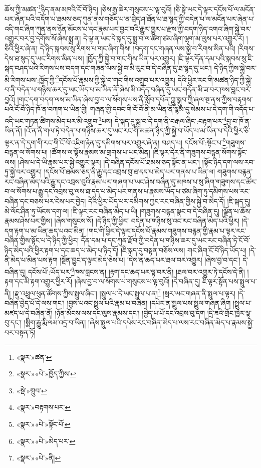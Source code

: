 ཆོས་ཀྱི་མཚན་\footnote{«སྣར་»ཚན་}ཉིད་ནམ་མཁའི་ངོ་བོ་ཉིད། །ཅེས་རྒྱ་ཆེར་གསུངས་པ་ལྟ་བུའོ། །ཅི་སྟེ་ཡང་དེ་ལྟར་དངོས་པོ་ལ་མངོན་པར་ཞེན་པའི་བདོག་པ་ཐམས་ཅད་ཀུན་ནས་གཅོད་པ་ན་བྲེད་ཤ་ཐོན་པ་ཐ་སྙད་ཀྱི་བདེན་པ་ལ་མངོན་པར་ཞེན་པ་འདི་གང་ཞིག་ཀུན་ནས་ཉོན་མོངས་པ་དང་རྣམ་པར་བྱང་བའི་རྒྱུར་གྱུར་པ་རྫས་ཀྱི་བདག་ཉིད་འགའ་ཞིག་སྐྱེ་བར་འགྱུར་བར་བྱ་དགོས་སོ་ཞེས་སྨྲ་ན། དེ་ལྟ་ན་ཡང་དེ་སྐད་དུ་སྨྲ་བ་ལ་ཚིག་ཙམ་ཞིག་ལྷག་མ་ལུས་པར་འགྱུར་རོ། །ཅིའི་ཕྱིར་ཞེ་ན། དེ་ཉིད་སྐབས་སུ་རིགས་པ་གང་ཞིག་གིས། །བདག་དང་གཞན་ལས་སྐྱེ་བ་རིགས་མིན་པའི། །རིགས་དེས་ཐ་སྙད་དུ་ཡང་རིགས་མིན་པས། །ཁྱོད་ཀྱི་སྐྱེ་བ་གང་གིས་ཡིན་པར་འགྱུར། །ཇི་ལྟར་དོན་དམ་པའི་སྐབས་སུ་ཇི་སྐད་བཤད་པའི་རིགས་པས་བདག་དང་གཞན་ལས་སྐྱེ་བ་མི་རུང་བ་དེ་བཞིན་དུ་ཐ་སྙད་དུ་ཡང་། དེ་ཉིད་ཀྱིས་སྐྱེ་བར་མི་རིགས་པས་:ཁྱོད་ཀྱི་\footnote{«སྣར་»«པེ་»ཁྱོད་ཀྱིས་}དངོས་པོ་རྣམས་ཀྱི་སྐྱེ་བ་གང་གིས་འགྲུབ་པར་འགྱུར། དེའི་ཕྱིར་རང་གི་མཚན་ཉིད་ཀྱི་སྐྱེ་བ་ནི་བདེན་པ་གཉིས་ཆར་དུ་ཡང་ཡོད་པ་མ་ཡིན་ནོ་ཞེས་མི་འདོད་བཞིན་དུ་ཡང་གདོན་མི་ཟ་བར་ཁས་བླང་བར་བྱའོ། །གང་དག་བདག་ལས་མ་ཡིན་ཞེས་བྱ་བ་ལ་སོགས་པས་ནི་སློབ་དཔོན་ཀླུ་སྒྲུབ་ཀྱི་ཞལ་སྔ་ནས་ཀྱིས་བརྟགས་པའི་ངོ་བོ་ཉིད་ཁོ་ན་བཀག་པ་ཡིན་གྱི། གཞན་གྱི་དབང་གི་ངོ་བོ་ནི་མ་ཡིན་ནོ་སྙམ་དུ་སེམས་པ་དེ་དག་གི་འདོད་པ་འདི་ཡང་གཏན་ཚིགས་མེད་པར་མི་འགྲུབ་\footnote{«སྡེ་»གྲུབ་}པས། དེ་སྐད་དུ་སྨྲ་བ་དེ་དག་ནི་བརྒལ་ཞིང་:བརྟག་པར་\footnote{«སྣར་»བརྟགས་པར་}བྱ་བ་ཁོ་ན་ཡིན་ནོ། །འོ་ན་ནི་གལ་ཏེ་བདེན་པ་གཉིས་ཆར་དུ་ཡང་རང་གི་མཚན་ཉིད་ཀྱི་སྐྱེ་བ་ཡོད་པ་མ་ཡིན་པ་དེའི་ཕྱིར་ཅི་ལྟར་ན་དེ་དག་གི་རང་གི་ངོ་བོ་འཇིག་རྟེན་དུ་དམིགས་པར་འགྱུར་ཞེ་ན། བཤད་པ། དངོས་པོ་:སྟོང་པ་\footnote{«སྣར་»«པེ་»སྟོང་པོ་}གཟུགས་བརྙན་ལ་སོགས་པ། །ཚོགས་ལ་ལྟོས་རྣམས་མ་གྲགས་པ་ཡང་མིན། །ཇི་ལྟར་དེར་ནི་གཟུགས་བརྙན་སོགས་སྟོང་ལས། །ཤེས་པ་དེ་ཡི་རྣམ་པར་སྐྱེ་འགྱུར་ལྟར། །དེ་བཞིན་དངོས་པོ་ཐམས་ཅད་སྟོང་ན་ཡང་། །སྟོང་ཉིད་དག་ལས་རབ་ཏུ་སྐྱེ་བར་འགྱུར། །དངོས་པོ་ཐམས་ཅད་ནི་རྒྱུ་དང་འབྲས་བུ་ཐ་དད་པ་མེད་པར་གནས་པ་ཡིན་ལ། གཟུགས་བརྙན་རང་བཞིན་མེད་པའི་རྒྱུ་དང་འབྲས་བུའི་རྣམ་པར་གཞག་པ་ཡང་ཤེས་བཞིན་དུ་མཁས་པ་སུ་ཞིག་གཟུགས་དང་ཚོར་བ་ལ་སོགས་པ་རྒྱུ་དང་འབྲས་བུ་ལས་ཐ་དད་པ་མེད་པར་གནས་པ་རྣམས་ཡོད་པ་ཙམ་ཞིག་ཏུ་དམིགས་པས་རང་བཞིན་དང་བཅས་པར་ངེས་པར་བྱེད། དེའི་ཕྱིར་ཡོད་པར་དམིགས་ཀྱང་རང་བཞིན་གྱིས་སྐྱེ་བ་མེད་དོ། །ཇི་སྐད་དུ། མེ་ལོང་ཤིན་ཏུ་ཡོངས་དག་ལ། །ཇི་ལྟར་རང་བཞིན་མེད་པ་ཡི། །གཟུགས་བརྙན་སྣང་བ་དེ་བཞིན་དུ། །ལྗོན་པ་ཆོས་རྣམས་ཤེས་པར་གྱིས། །ཞེས་གསུངས་སོ། །དེ་ཉིད་ཀྱི་ཕྱིར། བདེན་པ་གཉིས་སུ་འང་རང་བཞིན་མེད་པའི་ཕྱིར། །དེ་དག་རྟག་པ་མ་ཡིན་ཆད་པའང་མིན། །གང་གི་ཕྱིར་དེ་ལྟར་དངོས་པོ་རྣམས་གཟུགས་བརྙན་གྱི་རྣམ་པ་ལྟར་རང་བཞིན་གྱིས་སྟོང་པ་དེ་ཉིད་ཀྱི་ཕྱིར། དོན་དམ་པ་དང་ཀུན་རྫོབ་ཀྱི་བདེན་པ་གཉིས་ཆར་དུ་ཡང་རང་བཞིན་ཏེ་ངོ་བོ་ཉིད་མེད་པའི་ཕྱིར་རྟག་པ་དང་ཆད་པ་མེད་པ་ཉིད་དོ། །ཇི་སྐད་དུ་བསྟན་བཅོས་ལས། གང་ཞིག་ངོ་བོ་ཉིད་ཡོད་པ། །དེ་ནི་མེད་པ་མིན་པས་རྟག །སྔོན་བྱུང་ད་ལྟར་མེད་ཅེས་པ། །དེས་ན་ཆད་པར་ཐལ་བར་འགྱུར། །ཞེས་བྱ་བ་དང་། དེ་བཞིན་དུ། དངོས་པོ་:ཡོད་པར་\footnote{«སྣར་»«པེ་»མེད་པར་}ཁས་བླངས་ན། །རྟག་དང་ཆད་པར་ལྟ་བར་ནི། །ཐལ་བར་འགྱུར་ཏེ་དངོས་དེ་ནི། །རྟག་དང་མི་རྟག་འགྱུར་ཕྱིར་རོ། །ཞེས་བྱ་བ་ལ་སོགས་པ་གསུངས་པ་ལྟ་བུའོ། །དེ་བཞིན་དུ། ཇི་ལྟར་སྟོན་པས་སྤྲུལ་པ་ནི། །རྫུ་འཕྲུལ་ཕུན་ཚོགས་ཀྱིས་སྤྲུལ་ཞིང་། །སྤྲུལ་པ་དེ་ཡང་སྤྲུལ་པ་ན།\footnote{«སྣར་»«པེ་»ནི།} །སླར་ཡང་གཞན་ནི་སྤྲུལ་པ་ལྟར། །དེ་བཞིན་བྱེད་པོ་དེ་ལས་གང་། །བྱས་པའང་སྤྲུལ་པའི་རྣམ་པ་བཞིན། །དཔེར་ན་སྤྲུལ་པས་སྤྲུལ་གཞན་ཞིག །སྤྲུལ་པ་མཛད་པ་དེ་བཞིན་ནོ། །ཉོན་མོངས་ལས་དང་ལུས་རྣམས་དང་། །བྱེད་པ་པོ་དང་འབྲས་བུ་དག །དྲི་ཟའི་གྲོང་ཁྱེར་ལྟ་བུ་དང་། །སྨིག་རྒྱུ་རྨི་ལམ་འདྲ་བ་ཡིན། །ཞེས་སྤྲུལ་པའི་དཔེས་རང་བཞིན་མེད་པ་ལས་རང་བཞིན་མེད་པ་རྣམས་སྐྱེ་བར་བསྟན་ཏོ། 